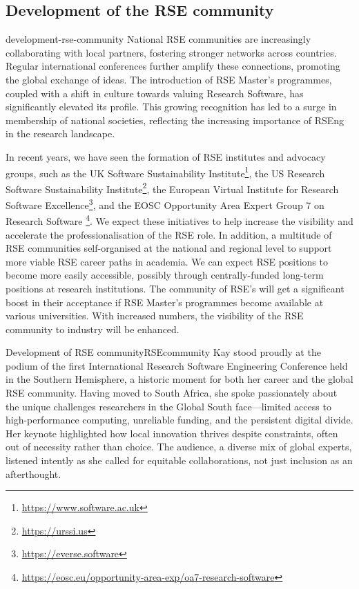 \documentclass{eceasst}
\begin{document}
\subsection{Development of the RSE community}
\begin{whatis}{}{development-rse-community}
National RSE communities are increasingly collaborating with local partners, fostering stronger networks across countries. Regular international conferences further amplify these connections, promoting the global exchange of ideas. The introduction of RSE Master's programmes, coupled with a shift in culture towards valuing Research Software, has significantly elevated its profile. This growing recognition has led to a surge in membership of national societies, reflecting the increasing importance of RSEng in the research landscape.
\end{whatis}
In recent years, we have seen the formation of RSE institutes and advocacy groups, such as
the UK Software Sustainability Institute\footnote{\url{https://www.software.ac.uk}},
the US Research Software Sustainability Institute\footnote{\url{https://urssi.us}},
the European Virtual Institute for Research Software Excellence\footnote{\url{https://everse.software}},
and the EOSC Opportunity Area Expert Group 7 on Research Software%
\footnote{\url{https://eosc.eu/opportunity-area-exp/oa7-research-software}}.
We expect these initiatives to help increase the visibility and accelerate
the professionalisation%
of the RSE role.
In addition, a multitude of RSE communities self-organised at the national
and regional level to support more viable RSE career paths in academia.
We can expect RSE positions to become more easily accessible, possibly through centrally-funded long-term positions at research institutions.
The community of RSE's will get a significant boost in their acceptance if RSE Master's programmes
become available at various universities.
With increased numbers, the visibility of the RSE community to industry will be enhanced.
\begin{story}{Development of RSE community}{RSEcommunity}
Kay stood proudly at the podium of the first International Research Software Engineering Conference held in the Southern Hemisphere, a historic moment for both her career and the global RSE community. Having moved to South Africa, she spoke passionately about the unique challenges researchers in the Global South face—limited access to high-performance computing, unreliable funding, and the persistent digital divide. Her keynote highlighted how local innovation thrives despite constraints, often out of necessity rather than choice. The audience, a diverse mix of global experts, listened intently as she called for equitable collaborations, not just inclusion as an afterthought.
\end{story}
\end{document}
